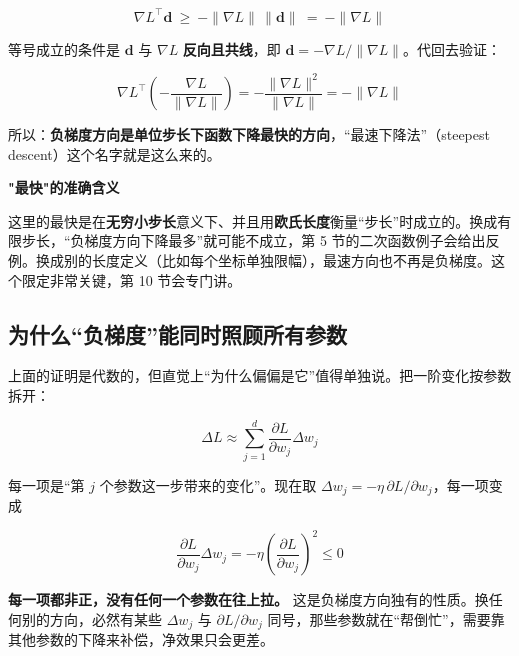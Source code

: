 \documentclass[UTF8, a4paper, zihao=-4, fontset=none]{ctexart}
\begin{document}
\[
\nabla L^\top\mathbf{d}\ \ge\ -\|\nabla L\|\,\|\mathbf{d}\|\ =\ -\|\nabla L\|
\]


等号成立的条件是 $\mathbf{d}$ 与 $\nabla L$ \textbf{反向且共线}，即 $\mathbf{d}=-\nabla L/\|\nabla L\|$。代回去验证：


\[
\nabla L^\top\left(-\frac{\nabla L}{\|\nabla L\|}\right)=-\frac{\|\nabla L\|^2}{\|\nabla L\|}=-\|\nabla L\|
\]


所以：\textbf{负梯度方向是单位步长下函数下降最快的方向}，“最速下降法”（steepest descent）这个名字就是这么来的。



\begin{warnbox}
{\bfseries\sffamily\small\color{warn} "最快"的准确含义}\par\vspace{2pt}
这里的最快是在\textbf{无穷小步长}意义下、并且用\textbf{欧氏长度}衡量“步长”时成立的。换成有限步长，“负梯度方向下降最多”就可能不成立，第 5 节的二次函数例子会给出反例。换成别的长度定义（比如每个坐标单独限幅），最速方向也不再是负梯度。这个限定非常关键，第 10 节会专门讲。


\end{warnbox}




\subsection{为什么“负梯度”能同时照顾所有参数}



上面的证明是代数的，但直觉上“为什么偏偏是它”值得单独说。把一阶变化按参数拆开：


\[
\Delta L\approx\sum_{j=1}^{d}\frac{\partial L}{\partial w_j}\Delta w_j
\]


每一项是“第 $j$ 个参数这一步带来的变化”。现在取 $\Delta w_j=-\eta\,\partial L/\partial w_j$，每一项变成


\[
\frac{\partial L}{\partial w_j}\Delta w_j=-\eta\left(\frac{\partial L}{\partial w_j}\right)^2\le 0
\]


\textbf{每一项都非正，没有任何一个参数在往上拉。} 这是负梯度方向独有的性质。换任何别的方向，必然有某些 $\Delta w_j$ 与 $\partial L/\partial w_j$ 同号，那些参数就在“帮倒忙”，需要靠其他参数的下降来补偿，净效果只会更差。
\end{document}
